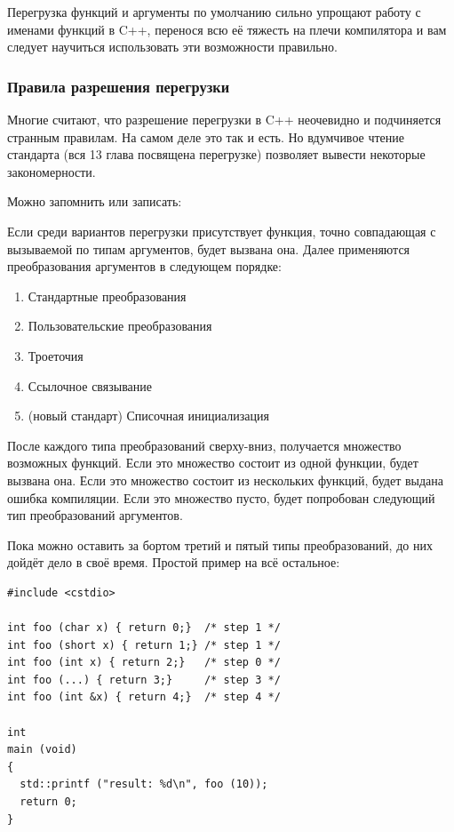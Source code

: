 \documentclass[a4paper,12pt,oneside]{article}
\begin{document}
Перегрузка функций и аргументы по умолчанию сильно упрощают работу с именами функций в C++, перенося всю её тяжесть на плечи компилятора и вам следует научиться использовать эти возможности правильно.

\subsubsection{Правила разрешения перегрузки}

Многие считают, что разрешение перегрузки в C++ неочевидно и подчиняется странным правилам. На самом деле это так и есть. Но вдумчивое чтение стандарта (вся 13 глава посвящена перегрузке) позволяет вывести некоторые закономерности. 

Можно запомнить или записать:

Если среди вариантов перегрузки присутствует функция, точно совпадающая с вызываемой по типам аргументов, будет вызвана она. Далее применяются преобразования аргументов в следующем порядке:

\begin{enumerate}
\item Стандартные преобразования
\item Пользовательские преобразования
\item Троеточия
\item Ссылочное связывание
\item (новый стандарт) Списочная инициализация
\end{enumerate}

После каждого типа преобразований сверху-вниз, получается множество возможных функций. Если это множество состоит из одной функции, будет вызвана она. Если это множество состоит из нескольких функций, будет выдана ошибка компиляции. Если это множество пусто, будет попробован следующий тип преобразований аргументов.

Пока можно оставить за бортом третий и пятый типы преобразований, до них дойдёт дело в своё время. Простой пример на всё остальное:

\begin{lstlisting}
#include <cstdio>

int foo (char x) { return 0;}  /* step 1 */
int foo (short x) { return 1;} /* step 1 */
int foo (int x) { return 2;}   /* step 0 */
int foo (...) { return 3;}     /* step 3 */
int foo (int &x) { return 4;}  /* step 4 */

int
main (void)
{
  std::printf ("result: %d\n", foo (10));
  return 0;
}
\end{lstlisting}
\end{document}
